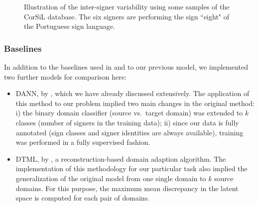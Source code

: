 \begin{figure}[t]
\begin{minipage}[t]{0.3\columnwidth}
    \end{minipage}
    \hspace{0.00mm}
    \begin{minipage}[t]{0.3\columnwidth}
    \end{minipage}
    \hspace{0.00mm}
    \begin{minipage}[t]{0.3\columnwidth}
    \end{minipage}
    \caption{Illustration of the inter-signer variability using some samples of the CorSiL database. The six signers are performing the sign ``eight" of the Portuguese sign language.}
    \label{fig:corsil}
\end{figure}

\subsubsection{Baselines}
In addition to the baselines used in  and to our previous model, we implemented two further models for comparison here:
\begin{itemize}
    \item DANN, by \citet{Ganin2015}, which we have already discussed extensively. The application of this method to our problem implied two main changes in the original method: i) the binary domain classifier (source vs.\ target domain) was extended to $k$ classes (number of signers in the training data); ii) since our data is fully annotated (sign classes and signer identities are always available), training was performed in a fully supervised fashion.
    \item DTML, by \citet{Hu2016}, a reconstruction-based domain adaption algorithm. The implementation of this methodology for our particular task also implied the generalization of the original model from one single domain to $k$ source domains. For this purpose, the maximum mean discrepancy in the latent space is computed for each pair of domains.
\end{itemize}

